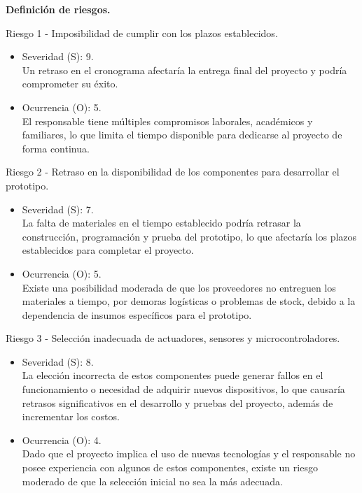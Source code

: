 \textbf{Definición de riesgos.}

Riesgo 1 - Imposibilidad de cumplir con los plazos establecidos.
\begin{itemize}
	\item Severidad (S): 9.\\ Un retraso en el cronograma afectaría la entrega final del
	      proyecto y podría comprometer su éxito.
	\item Ocurrencia (O): 5.\\ El responsable tiene múltiples compromisos laborales,
	      académicos y familiares, lo que limita el tiempo disponible para dedicarse al
	      proyecto de forma continua.
\end{itemize}

Riesgo 2 - Retraso en la disponibilidad de los componentes para desarrollar el
prototipo.
\begin{itemize}
	\item Severidad (S): 7.\\ La falta de materiales en el tiempo establecido podría
	      retrasar la construcción, programación y prueba del prototipo, lo que afectaría
	      los plazos establecidos para completar el proyecto.
	\item Ocurrencia (O): 5.\\ Existe una posibilidad moderada de que los proveedores no
	      entreguen los materiales a tiempo, por demoras logísticas o problemas de
	      stock, debido a la dependencia de insumos específicos para el prototipo.
\end{itemize}

Riesgo 3 - Selección inadecuada de actuadores, sensores y microcontroladores.
\begin{itemize}
	\item Severidad (S): 8.\\ La elección incorrecta de estos componentes puede generar
	      fallos en el funcionamiento o necesidad de adquirir nuevos dispositivos, lo que
	      causaría retrasos significativos en el desarrollo y pruebas del proyecto,
	      además de incrementar los costos.
	\item Ocurrencia (O): 4.\\ Dado que el proyecto implica el uso de nuevas tecnologías
	      y el responsable no posee experiencia con algunos de estos componentes, existe
	      un riesgo moderado de que la selección inicial no sea la más adecuada.
\end{itemize}

